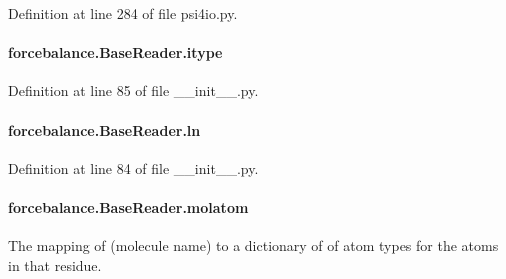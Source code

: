 Definition at line 284 of file psi4io.\-py.

\hypertarget{classforcebalance_1_1BaseReader_a22ff3f4c684c728e019d801fface36f6}{
\paragraph[{itype}]{\setlength{\rightskip}{0pt plus 5cm}forcebalance.\-Base\-Reader.\-itype\hspace{0.3cm}{\ttfamily [inherited]}}}\label{classforcebalance_1_1BaseReader_a22ff3f4c684c728e019d801fface36f6}


Definition at line 85 of file \-\_\-\-\_\-init\-\_\-\-\_\-.\-py.

\hypertarget{classforcebalance_1_1BaseReader_a80c8e3bea212600742968aa8669e557b}{
\paragraph[{ln}]{\setlength{\rightskip}{0pt plus 5cm}forcebalance.\-Base\-Reader.\-ln\hspace{0.3cm}{\ttfamily [inherited]}}}\label{classforcebalance_1_1BaseReader_a80c8e3bea212600742968aa8669e557b}


Definition at line 84 of file \-\_\-\-\_\-init\-\_\-\-\_\-.\-py.

\hypertarget{classforcebalance_1_1BaseReader_ab444c213e15929253dd73395ac5f19fc}{
\paragraph[{molatom}]{\setlength{\rightskip}{0pt plus 5cm}forcebalance.\-Base\-Reader.\-molatom\hspace{0.3cm}{\ttfamily [inherited]}}}\label{classforcebalance_1_1BaseReader_ab444c213e15929253dd73395ac5f19fc}


The mapping of (molecule name) to a dictionary of of atom types for the atoms in that residue. 

